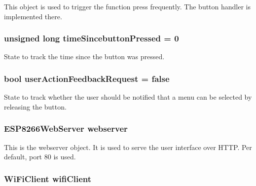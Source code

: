 This object is used to trigger the function press frequently. The button handler is implemented there. 

\hypertarget{WIFIOnOff_8ino_a244ed52f592c09418e6feee15f1cecd5}{
\subsubsection[{time\-Sincebutton\-Pressed}]{\setlength{\rightskip}{0pt plus 5cm}unsigned long time\-Sincebutton\-Pressed = 0}}\label{WIFIOnOff_8ino_a244ed52f592c09418e6feee15f1cecd5}


State to track the time since the button was pressed. 

\hypertarget{WIFIOnOff_8ino_a3e5c7c27259449622535aee1125f275a}{
\subsubsection[{user\-Action\-Feedback\-Request}]{\setlength{\rightskip}{0pt plus 5cm}bool user\-Action\-Feedback\-Request = false}}\label{WIFIOnOff_8ino_a3e5c7c27259449622535aee1125f275a}


State to track whether the user should be notified that a menu can be selected by releasing the button. 

\hypertarget{WIFIOnOff_8ino_a0c2e905cdd4621947a7d6c966383e28c}{
\subsubsection[{webserver}]{\setlength{\rightskip}{0pt plus 5cm}E\-S\-P8266\-Web\-Server webserver}}\label{WIFIOnOff_8ino_a0c2e905cdd4621947a7d6c966383e28c}


This is the webserver object. It is used to serve the user interface over H\-T\-T\-P. Per default, port 80 is used. 

\hypertarget{WIFIOnOff_8ino_a64f7c60366b0a82c42d7a1dbf4e9505a}{
\subsubsection[{wifi\-Client}]{\setlength{\rightskip}{0pt plus 5cm}Wi\-Fi\-Client wifi\-Client}}\label{WIFIOnOff_8ino_a64f7c60366b0a82c42d7a1dbf4e9505a}


